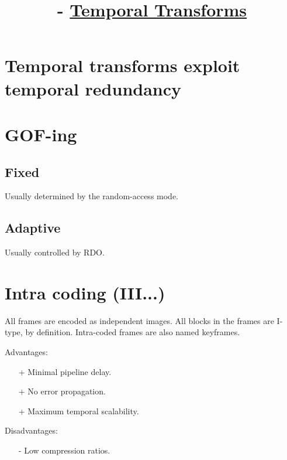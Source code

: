 


\title{\SM{} - \href{https://github.com/Sistemas-Multimedia/Sistemas-Multimedia.github.io/tree/master/contents/temporal_transforms}{Temporal Transforms}}

\maketitle
\tableofcontents

\section{Temporal transforms exploit temporal redundancy}

\section{GOF-ing}

\subsection{Fixed}

Usually determined by the random-access mode.

\subsection{Adaptive}

Usually controlled by RDO.

\section{Intra coding (III...)}

All frames are encoded as independent images.  All blocks in the
frames are I-type, by definition. Intra-coded frames are also named
keyframes.

Advantages:
\begin{itemize}
\item [+] Minimal pipeline delay.
\item [+] No error propagation.
\item [+] Maximum temporal scalability.
\end{itemize}

Disadvantages:
\begin{enumerate}
\item [-] Low compression ratios.
\end{enumerate}

